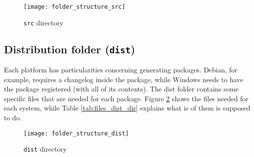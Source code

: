 \begin{figure}[h!]
\centering
\texttt{[image: folder\_structure\_src]}
\caption{\texttt{src} directory}
\label {fig:folder_structure_src}
\end{figure}

\subsection{Distribution folder (\texttt{dist})}
\label{sec:dist_folder}

Each platform has particularities concerning generating packages. Debian, for example, requires a changelog inside the package, while Windows needs to have the package registered (with all of its contents). The dist folder contains some specific files that are needed for each package. Figure \ref{fig:folder_structure_dist} shows the files needed for each system, while Table \ref{tab:files_dist_dir} explains what is of them is supposed to do.

\begin{figure}[h!]
\centering
\texttt{[image: folder\_structure\_dist]}
\caption{\texttt{dist} directory}
\label {fig:folder_structure_dist}
\end{figure}

